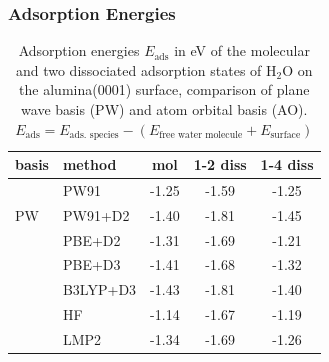 \documentclass[hyperref={pdfpagelabels=false}]{beamer}
\begin{document}
\begin{frame}
 \frametitle{Adsorption Energies}
 \begin{table}[!h]
  \centering
   \caption{Adsorption energies $E_\textrm{ads}$ in eV of the molecular and two dissociated adsorption states of H$_2$O on the alumina(0001) surface, comparison of plane wave basis (PW) and atom orbital basis (AO).
   $E_{\textrm{ads}}=E_{\textrm{ads. species}}-(E_{\textrm{free water molecule}}+E_{\textrm{surface}})$}
  \begin{tabular}{ll|ccc}%
  \toprule
basis& method & mol & 1-2 diss & 1-4 diss\\\midrule
  \multirow{3}{1cm}{PW}&PW91 &{\color{orange}-1.25} &-1.59 &{\color{orange}-1.25} \\
  &PW91+D2&-1.40 &-1.81 &{\color{red}-1.45} \\
  &PBE+D2 & {\color{red}-1.31} & -1.69 & -1.21 \\
  \midrule \pause
  \multirow{4}{1cm}{AO}&PBE+D3 &{\color{red}-1.41} &-1.68 &-1.32 \\
  &B3LYP+D3 &{\color{red}-1.43} &-1.81 &-1.40 \\
  &HF &-1.14 &-1.67 &{\color{red}-1.19} \\
  &LMP2 &{\color{red}-1.34} & -1.69&-1.26\\
  \bottomrule
  \end{tabular}
 \end{table}
\end{frame}
\end{document}
